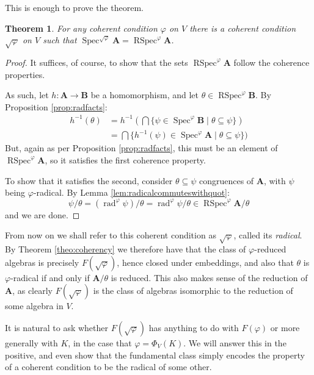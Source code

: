 \documentclass{article}
\theoremstyle{plain}
\newtheorem{theorem}{Theorem}[section]
\theoremstyle{definition}
\newcommand{\Spec}{\operatorname{Spec}}
\newcommand{\RSpec}{\operatorname{RSpec}}
\newcommand{\rad}{\operatorname{rad}}
\begin{document}
This is enough to prove the theorem.

\begin{theorem} \label{theo:radiscc}
    For any coherent condition $\varphi$ on $V$ there is a coherent condition $\sqrt{\varphi}$ on $V$ such that $\Spec^{\sqrt{\varphi}}\mathbf{A} = \RSpec^\varphi\mathbf{A}$.
\end{theorem}
\begin{proof}
    It suffices, of course, to show that the sets $\RSpec^\varphi\mathbf{A}$ follow the coherence properties.\par
    As such, let $h\colon \mathbf{A} \rightarrow \mathbf{B}$ be a homomorphism, and let $\theta \in \RSpec^\varphi\mathbf{B}$.
    By Proposition \ref{prop:radfacts}:
    \begin{align*}
        h^{-1}(\theta) &= h^{-1}(\bigcap\{ \psi \in \Spec^\varphi\mathbf{B} \mid \theta \subseteq \psi \})\\
        &= \bigcap \{ h^{-1}(\psi) \in \Spec^\varphi\mathbf{A} \mid \theta \subseteq \psi \})
    \end{align*}
    But, again as per Proposition \ref{prop:radfacts}, this must be an element of $\RSpec^\varphi\mathbf{A}$, so it satisfies the first coherence property.\par
    To show that it satisfies the second, consider $\theta \subseteq \psi$ congruences of $\mathbf{A}$, with $\psi$ being $\varphi$-radical.
    By Lemma \ref{lem:radicalcommuteswithquot}:
    $$\psi/\theta = (\rad^\varphi\psi)/\theta = \rad^\varphi\psi/\theta \in \RSpec^\varphi\mathbf{A}/\theta$$
    and we are done.
\end{proof}

From now on we shall refer to this coherent condition as $\sqrt{\varphi}$, called its \textit{radical}.
By Theorem \ref{theo:coherency} we therefore have that the class of $\varphi$-reduced algebras is precisely $F(\sqrt{\varphi})$, hence closed under embeddings, and also that $\theta$ is $\varphi$-radical if and only if $\mathbf{A}/\theta$ is reduced.
This also makes sense of the reduction of $\mathbf{A}$, as clearly $F(\sqrt{\varphi})$ is the class of algebras isomorphic to the reduction of some algebra in $V$.\par
It is natural to ask whether $F(\sqrt{\varphi})$ has anything to do with $F(\varphi)$ or more generally with $K$, in the case that $\varphi = \Phi_V(K)$.
We will answer this in the positive, and even show that the fundamental class simply encodes the property of a coherent condition to be the radical of some other.
\end{document}
